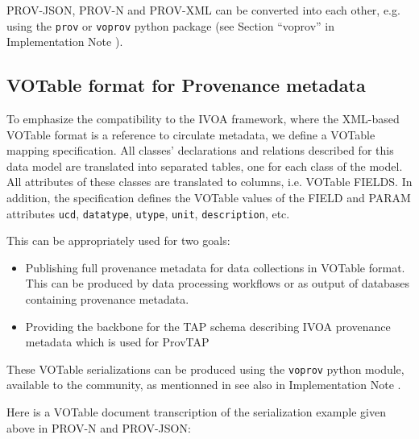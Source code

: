 \noindent
PROV-JSON, PROV-N and PROV-XML can be converted into each other, e.g.  using the \texttt{prov} or \texttt{voprov} python package (see Section ``voprov'' in Implementation Note \citep{std:ProvenanceImplementationNote}).

\subsection{VOTable format for Provenance metadata} 


To emphasize the compatibility to the IVOA framework, where the XML-based VOTable
format is a reference to circulate metadata, we define a VOTable mapping
specification. All classes' declarations and relations described for this data model are translated into separated tables, one for each class of the model.
All attributes of these classes are
translated to columns, i.e. VOTable FIELDS. In addition, the specification
defines the VOTable values of the FIELD and PARAM attributes \texttt{ucd},
\texttt{datatype}, \texttt{utype}, \texttt{unit}, \texttt{description}, etc.

This can be appropriately used for two goals:
\begin{itemize}
	\item Publishing full provenance metadata for data collections in VOTable format. This can be produced by data processing workflows or as output of databases containing provenance metadata.
	\item Providing the backbone for the TAP schema describing IVOA provenance metadata which is used for ProvTAP 
\end{itemize}

These VOTable serializations can be produced using the \texttt{voprov} python module, available to the community, as mentionned in see also in Implementation Note \citep[]{std:ProvenanceImplementationNote}.

Here is a VOTable document transcription of the serialization example given above in PROV-N and PROV-JSON:

